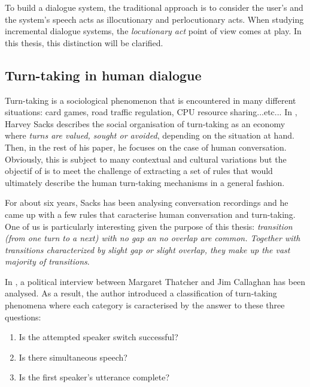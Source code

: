         To build a dialogue system, the traditional approach is to consider the user's and the system's speech acts as illocutionary and perlocutionary acts. When studying incremental dialogue systems, the \textit{locutionary act} point of view comes at play. In this thesis, this distinction will be clarified.
        
    \subsection{Turn-taking in human dialogue}
    \label{soa:ttphuman}
		
    
    	Turn-taking is a sociological phenomenon that is encountered in many different situations: card games, road traffic regulation, CPU resource sharing...etc... In \cite{Sacks1974}, Harvey Sacks describes the social organisation of turn-taking as an economy where \textit{turns are valued, sought or avoided}, depending on the situation at hand. Then, in the rest of his paper, he focuses on the case of human conversation. Obviously, this is subject to many contextual and cultural variations but the objectif of \cite{Sacks1974} is to meet the challenge of extracting a set of rules that would ultimately describe the human turn-taking mechanisms in a general fashion.
        
        For about six years, Sacks has been analysing conversation recordings and he came up with a few rules that caracterise human conversation and turn-taking. One of us is particularly interesting given the purpose of this thesis: \textit{transition (from one turn to a next) with no gap an no overlap are common. Together with transitions characterized by slight gap or slight overlap, they make up the vast majority of transitions}.
        
        In \cite{Beattie1982}, a political interview between Margaret Thatcher and Jim Callaghan has been analysed. As a result, the author introduced a classification of turn-taking phenomena where each category is caracterised by the answer to these three questions:
        
        \begin{enumerate}
            \item Is the attempted speaker switch successful?
            \item Is there simultaneous speech?
            \item Is the first speaker's utterance complete?
        \end{enumerate}
        
